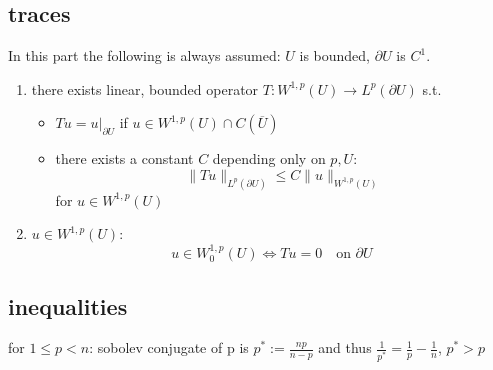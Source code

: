 \subsection{traces}
In this part the following is always assumed: $U$ is bounded, $\partial U$ is $C^1$.

\begin{enumerate}[label = (\alph*)]
	\item there exists linear, bounded operator $T:W^{1,p}(U) \to L^p(\partial U)$ s.t.
	\begin{itemize}
		\item $Tu = u|_{\partial U}$ if $u \in W^{1,p}(U)\cap C(\overline{U})$
		\item  there exists a constant $C$ depending only on $p,U$: \begin{equation*}
			\|Tu\|_{L^p(\partial U)} \leq C \|u\|_{W^{1,p}(U)}
		\end{equation*}
		for $u \in W^{1,p}(U)$
	\end{itemize}

	\item $u \in W^{1,p}(U)$:
	\begin{equation*}
		u \in W^{1,p}_0(U) \iff Tu = 0 \quad \text{on } \partial U
	\end{equation*} 
\end{enumerate}

\subsection{inequalities}
 for $1 \leq p < n$: sobolev conjugate of p is $p^* := \frac{np}{n-p}$ and thus $\frac{1}{p^*} = \frac{1}{p} - \frac{1}{n}$, $p^* > p$
 

